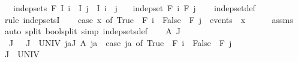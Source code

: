 \begin{isabellebody}
\ \ \ {\isachardoublequoteopen}indep{\isacharunderscore}{\kern0pt}sets\ F\ I{\isachardoublequoteclose}\ {\isachardoublequoteopen}i\ {\isasymin}\ I{\isachardoublequoteclose}\ {\isachardoublequoteopen}j\ {\isasymin}\ I{\isachardoublequoteclose}\ {\isachardoublequoteopen}i\ {\isasymnoteq}\ j{\isachardoublequoteclose}\isanewline
\ \ \ {\isachardoublequoteopen}indep{\isacharunderscore}{\kern0pt}set\ {\isacharparenleft}{\kern0pt}F\ i{\isacharparenright}{\kern0pt}\ {\isacharparenleft}{\kern0pt}F\ j{\isacharparenright}{\kern0pt}{\isachardoublequoteclose}\isanewline
%
\isadelimproof
\ \ %
\endisadelimproof
%
\isatagproof
{}\isamarkupfalse%
\ indep{\isacharunderscore}{\kern0pt}set{\isacharunderscore}{\kern0pt}def\isanewline
{}\isamarkupfalse%
\ {\isacharparenleft}{\kern0pt}rule\ indep{\isacharunderscore}{\kern0pt}setsI{\isacharparenright}{\kern0pt}\isanewline
\ \ \isamarkupfalse%
\ {\isachardoublequoteopen}{\isacharparenleft}{\kern0pt}case\ x\ of\ True\ {\isasymRightarrow}\ F\ i\ {\isacharbar}{\kern0pt}\ False\ {\isasymRightarrow}\ F\ j{\isacharparenright}{\kern0pt}\ {\isasymsubseteq}\ events{\isachardoublequoteclose}\ \ x\isanewline
\ \ \ \ \isamarkupfalse%
\ assms\ \isamarkupfalse%
\ {\isacharparenleft}{\kern0pt}auto\ split{\isacharcolon}{\kern0pt}\ bool{\isachardot}{\kern0pt}split\ simp{\isacharcolon}{\kern0pt}\ indep{\isacharunderscore}{\kern0pt}sets{\isacharunderscore}{\kern0pt}def{\isacharparenright}{\kern0pt}\isanewline
\ \ \isamarkupfalse%
\ A\ J\ \isamarkupfalse%
\ {\isacharasterisk}{\kern0pt}{\isacharcolon}{\kern0pt}\ {\isachardoublequoteopen}J\ {\isasymnoteq}\ {\isacharbraceleft}{\kern0pt}{\isacharbraceright}{\kern0pt}{\isachardoublequoteclose}\ {\isachardoublequoteopen}J\ {\isasymsubseteq}\ UNIV{\isachardoublequoteclose}\ {\isachardoublequoteopen}{\isasymforall}ja{\isasymin}J{\isachardot}{\kern0pt}\ A\ ja\ {\isasymin}\ {\isacharparenleft}{\kern0pt}case\ ja\ of\ True\ {\isasymRightarrow}\ F\ i\ {\isacharbar}{\kern0pt}\ False\ {\isasymRightarrow}\ F\ j{\isacharparenright}{\kern0pt}{\isachardoublequoteclose}\isanewline
\ \ \isacommand{{\isacharbraceleft}{\kern0pt}}\isamarkupfalse%
\isanewline
\ \ \ \ \isamarkupfalse%
\ {\isachardoublequoteopen}J\ {\isacharequal}{\kern0pt}\ UNIV{\isachardoublequoteclose}\isanewline
\ \ \ \ \isamarkupfalse%
\ \isamarkupfalse%

\end{isabellebody}
